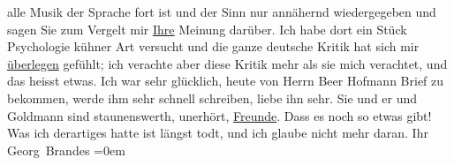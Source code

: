\begin{ledgroupsized}[t]{13cm}
               alle Musik der Sprache fort ist und der Sinn nur annähernd wiedergegeben und sagen
               Sie zum Vergelt mir \uline{Ihre} Meinung darüber. Ich habe
               dort ein Stück Psychologie kühner Art versucht und die ganze deutsche Kritik hat sich
               mir \uline{überlegen} gefühlt; ich verachte aber diese Kritik
               mehr als sie mich verachtet, und das heisst etwas.\pend
           \pstart
           Ich war sehr glücklich, heute von Herrn Beer
                  Hofmann Brief zu bekommen, werde ihm sehr schnell schreiben, liebe ihn sehr.
               Sie und er und Goldmann sind staunenswerth,
               unerhört, \uline{Freunde}. Dass es noch so etwas gibt! Was
               ich derartiges hatte ist längst todt, und ich glaube nicht mehr daran.\pend
           \pstart
           Ihr{\\[\baselineskip]}\spacefill\mbox{Georg Brandes}\pend
           \leftskip=0em{}\endnumbering{}\end{ledgroupsized}  \newcommand{\dateiname}{L00639}\newcommand{\titel}{Georg Brandes an Arthur Schnitzler, 16. 1. 1897}\newcommand{\editorInnen}{Martin Anton Müller und Gerd-Hermann Susen}
      